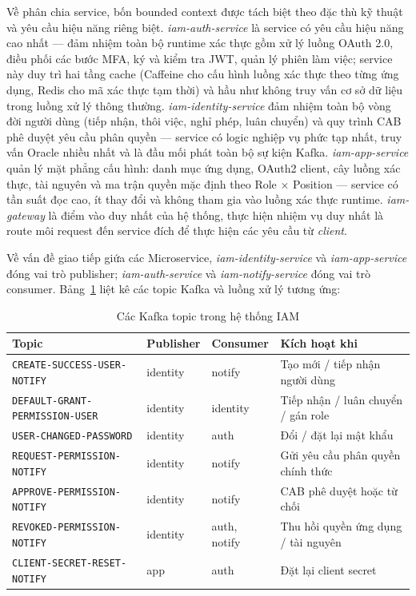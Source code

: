 \documentclass[../DoAn.tex]{subfiles}
\begin{document}
Về phân chia service, bốn bounded context được tách biệt theo đặc thù kỹ thuật và yêu cầu hiệu năng riêng biệt. \textit{iam-auth-service} là service có yêu cầu hiệu năng cao nhất — đảm nhiệm toàn bộ runtime xác thực gồm xử lý luồng OAuth 2.0, điều phối các bước MFA, ký và kiểm tra JWT, quản lý phiên làm việc; service này duy trì hai tầng cache (Caffeine cho cấu hình luồng xác thực theo từng ứng dụng, Redis cho mã xác thực tạm thời) và hầu như không truy vấn cơ sở dữ liệu trong luồng xử lý thông thường. \textit{iam-identity-service} đảm nhiệm toàn bộ vòng đời người dùng (tiếp nhận, thôi việc, nghỉ phép, luân chuyển) và quy trình CAB phê duyệt yêu cầu phân quyền — service có logic nghiệp vụ phức tạp nhất, truy vấn Oracle nhiều nhất và là đầu mối phát toàn bộ sự kiện Kafka. \textit{iam-app-service} quản lý mặt phẳng cấu hình: danh mục ứng dụng, OAuth2 client, cây luồng xác thực, tài nguyên và ma trận quyền mặc định theo Role $\times$ Position — service có tần suất đọc cao, ít thay đổi và không tham gia vào luồng xác thực runtime. \textit{iam-gateway} là điểm vào duy nhất của hệ thống, thực hiện nhiệm vụ duy nhất là route môi request đến service đích để thực hiện các yêu cầu từ \textit{client}.

Về vấn đề giao tiếp giứa các Microservice, \textit{iam-identity-service} và \textit{iam-app-service} đóng vai trò publisher; \textit{iam-auth-service} và \textit{iam-notify-service} đóng vai trò consumer. Bảng~\ref{tab:kafka-topics} liệt kê các topic Kafka và luồng xử lý tương ứng:

\begin{table}[H]
\centering
\caption{Các Kafka topic trong hệ thống IAM}
\label{tab:kafka-topics}
\begin{tabular}{|p{5.5cm}|p{2.5cm}|p{2.5cm}|p{2.5cm}|}
\hline
\textbf{Topic} & \textbf{Publisher} & \textbf{Consumer} & \textbf{Kích hoạt khi} \\
\hline
\texttt{CREATE-SUCCESS-USER-NOTIFY} & identity & notify & Tạo mới / tiếp nhận người dùng \\
\hline
\texttt{DEFAULT-GRANT-PERMISSION-USER} & identity & identity & Tiếp nhận / luân chuyển / gán role \\
\hline
\texttt{USER-CHANGED-PASSWORD} & identity & auth & Đổi / đặt lại mật khẩu \\
\hline
\texttt{REQUEST-PERMISSION-NOTIFY} & identity & notify & Gửi yêu cầu phân quyền chính thức \\
\hline
\texttt{APPROVE-PERMISSION-NOTIFY} & identity & notify & CAB phê duyệt hoặc từ chối \\
\hline
\texttt{REVOKED-PERMISSION-NOTIFY} & identity & auth, notify & Thu hồi quyền ứng dụng / tài nguyên \\
\hline
\texttt{CLIENT-SECRET-RESET-NOTIFY} & app & auth & Đặt lại client secret \\
\hline
\end{tabular}
\end{table}
\end{document}
